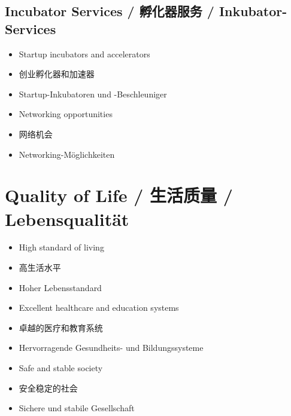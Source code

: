 \subsection{Incubator Services / 孵化器服务 / Inkubator-Services}
\begin{itemize}
    \item Startup incubators and accelerators
    \item 创业孵化器和加速器
    \item Startup-Inkubatoren und -Beschleuniger
    \item Networking opportunities
    \item 网络机会
    \item Networking-Möglichkeiten
\end{itemize}

\section{Quality of Life / 生活质量 / Lebensqualität}

\begin{itemize}
    \item High standard of living
    \item 高生活水平
    \item Hoher Lebensstandard
    \item Excellent healthcare and education systems
    \item 卓越的医疗和教育系统
    \item Hervorragende Gesundheits- und Bildungssysteme
    \item Safe and stable society
    \item 安全稳定的社会
    \item Sichere und stabile Gesellschaft
\end{itemize}
